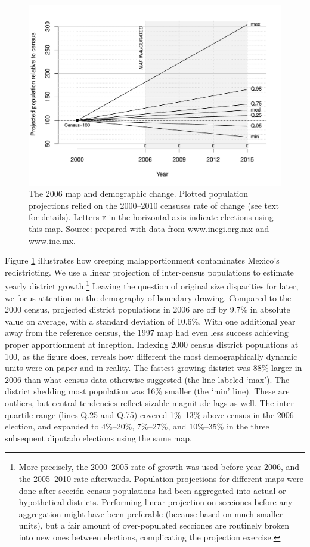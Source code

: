 \documentclass[letter,12pt]{article}
\begin{document}
\begin{figure}
\centering 
  \includegraphics[width=.8\columnwidth]{disRelPopProj2006map.pdf} 
  \caption{The 2006 map and demographic change. Plotted population projections relied on the 2000--2010 censuses rate of change (see text for details). Letters \textsc{e} in the horizontal axis indicate elections using this map. Source: prepared with data from \url{www.inegi.org.mx} and \url{www.ine.mx}.}\label{F:disRelPop2006map}
\end{figure}

Figure \ref{F:disRelPop2006map} illustrates how creeping malapportionment contaminates Mexico's redistricting. We use a linear projection of inter-census populations to estimate yearly district growth.\footnote{More precisely, the 2000--2005 rate of growth was used before year 2006, and the 2005--2010 rate afterwards. Population projections for different maps were done after secci\'on census populations had been aggregated into actual or hypothetical districts. Performing linear projection on secciones before any aggregation might have been preferable (because based on much smaller units), but a fair amount of over-populated secciones are routinely broken into new ones between elections, complicating the projection exercise.} Leaving the question of original size disparities for later, we focus attention on the demography of boundary drawing. Compared to the 2000 census, projected district populations in 2006 are off by 9.7\% in absolute value on average, with a standard deviation of 10.6\%. With one additional year away from the reference census, the 1997 map had even less success achieving proper apportionment at inception. Indexing 2000 census district populations at 100, as the figure does, reveals how different the most demographically dynamic units were on paper and in reality. The fastest-growing district was 88\% larger in 2006 than what census data otherwise suggested (the line labeled `max'). The district shedding most population was 16\% smaller (the `min' line). These are outliers, but central tendencies reflect sizable magnitude lags as well. The inter-quartile range (lines Q.25 and Q.75) covered 1\%--13\% above census in the 2006 election, and expanded to 4\%--20\%, 7\%--27\%, and 10\%--35\% in the three subsequent diputado elections using the same map.
 
\end{document}
